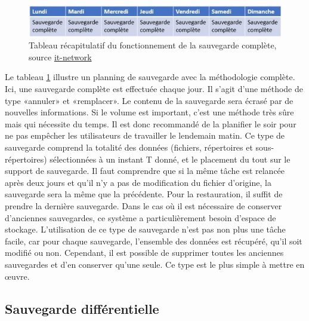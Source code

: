 \documentclass[pfe]{tnreport} %
\begin{document}
\begin{figure}[ht]
 \centering
 \includegraphics[width=15cm]{figures/complete-624x79.jpg}
 \caption{Tableau récapitulatif du fonctionnement de la sauvegarde complète, source
 \href{https://all-it-network.com/types-sauvegarde/}{it-network}}
 \label{fig:complete}
\end{figure}
Le tableau \ref{fig:complete} illustre un planning de sauvegarde avec la méthodologie complète. Ici, une sauvegarde complète est effectuée chaque jour. \newline
Il s'agit d'une méthode de type «annuler» et «remplacer». Le contenu de la sauvegarde sera écrasé par de nouvelles informations. Si le volume est important, c'est une méthode très sûre mais qui nécessite du temps. Il est donc recommandé de la planifier le soir pour ne pas empêcher les utilisateurs de travailler le lendemain matin. \newline
Ce type de sauvegarde comprend la totalité des données (fichiers, répertoires et sous-répertoires) sélectionnées à un instant T donné, et le placement du tout sur le support de sauvegarde. \newline 
Il faut comprendre que si la même tâche est relancée après deux jours et qu'il n'y a pas de modification du fichier d'origine, la sauvegarde sera la même que la précédente. \newline
Pour la restauration, il suffit de prendre la dernière sauvegarde. \newline
Dans le cas où il est nécessaire de conserver d'anciennes sauvegardes, ce système a particulièrement besoin d'espace de stockage. \newline
L'utilisation de ce type de sauvegarde n'est pas non plus une tâche facile, car pour chaque sauvegarde, l'ensemble des données est récupéré, qu'il soit modifié ou non. \newline
Cependant, il est possible de supprimer toutes les anciennes sauvegardes et d'en conserver qu'une seule.\newline
Ce type est le plus simple à mettre en œuvre. 
\subsection{Sauvegarde différentielle}
\end{document}
